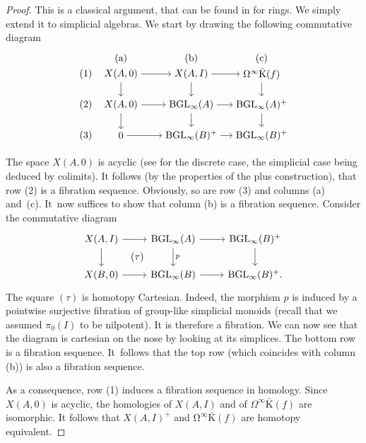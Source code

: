 \documentclass[11pt]{article}
\let\widebar\bar
\theoremstyle{definition}
\DeclareMathOperator{\BGL}{BGL}
\newcommand{\bK}{\widebar{\mathrm{K}}}
\newcommand{\infloop}{\operatorname{\Omega^\infty}}
\begin{document}
\begin{proof}
This is a classical argument, that can be found in \cite[\S11.3]{loday:hc} for rings. We simply extend it to simplicial algebras.
We start by drawing the following commutative diagram\vspace*{-10pt}
\[
\begin{tikzpicture}[baseline=0em,xscale=0.25em,yscale=-.11em]
\node (00) at (0,0) {$X(A,0)$};
\node (10) at (1,0) {$X(A,I)$};
\node (20) at (2,0) {$\Omega^{\infty}\bK(f)$};
\node (01) at (0,1) {$X(A,0)$};
\node (11) at (1,1) {$\BGL_\infty(A)$};
\node (21) at (2,1) {$\BGL_\infty(A)^+$};
\node (02) at (0,2) {$0$};
\node (12) at (1,2) {$\BGL_\infty(B)^+$};
\node (22) at (2,2) {$\BGL_\infty(B)^+$};

\node (A) at (0, -0.5) {(a)};
\node (B) at (1, -0.5) {(b)};
\node (C) at (2, -0.5) {(c)};
\node (1) at (-0.5, 0) {(1)};
\node (2) at (-0.5, 1) {(2)};
\node (3) at (-0.5, 2) {(3)};

\path[commutative diagrams/.cd, every arrow, every label]
(00) edge (10) edge (01)
(10) edge (20) edge (11)
(20) edge (21)
(01) edge (11) edge (02)
(11) edge (21) edge (12)
(02) edge (12)
(12) edge (22)
(21) edge (22);
\end{tikzpicture}
\]

The space $X(A,0)$ is acyclic (see \cite{suslin:eqK} for the discrete case, the simplicial case being deduced by colimits). It follows (by the properties of the plus construction), that row (2) is a fibration sequence. Obviously, so are  row (3) and  columns (a) and~(c).
It~now suffices to show that column (b) is a fibration sequence.
Consider the commutative diagram\vspace*{-3pt}\enlargethispage{.5\baselineskip}%
\[
\begin{tikzcd}
X(A,I) \ar[r] \ar[d] \ar[dr, phantom, "\displaystyle (\tau)"] & \BGL_\infty(A) \ar[d, "p"] \ar[r] & \BGL_\infty(B)^+ \ar[d] \\
X(B,0) \ar[r] & \BGL_\infty(B) \ar[r] & \BGL_\infty(B)^+.
\end{tikzcd}
\]
The square $(\tau)$ is homotopy Cartesian. Indeed, the morphism $p$ is induced by a pointwise surjective fibration of group-like simplicial monoids (recall that we assumed $\pi_0(I)$ to be nilpotent). It is therefore a fibration. We can now see that the diagram is cartesian on the nose by looking at its simplices.
The bottom row is a fibration sequence. It~follows that the top row (which coincides with column (b)) is also a fibration sequence.

As a consequence, row (1) induces a fibration sequence in homology. Since $X(A,0)$ is acyclic, the homologies of $X(A,I)$ and of $\Omega^{\infty}\bK(f)$ are isomorphic. It follows that $X(A,I)^+$ and $\infloop \bK(f)$ are homotopy equivalent.
\end{proof}
\end{document}
